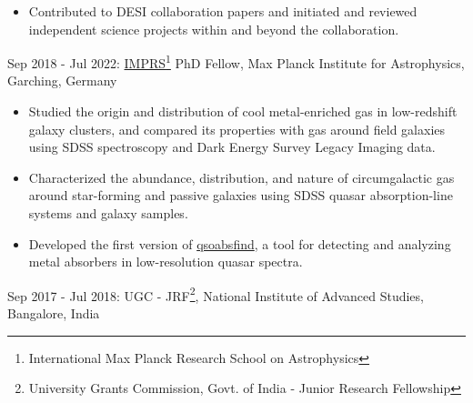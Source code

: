 \documentclass[11pt,letterpaper]{article}
\begin{document}
\begin{list}{}{\cvlist}
\begin{itemize}
  \item Contributed to DESI collaboration papers and initiated and reviewed independent science projects within and beyond the collaboration.

  \vspace{-1mm}
\end{itemize}

\item Sep 2018 - Jul 2022: \href{https://www.imprs-astro.mpg.de/content/student-class-2018-2021.html}{IMPRS\footnote{International Max Planck Research School on Astrophysics} PhD Fellow}, Max Planck Institute for Astrophysics, Garching, Germany
\begin{itemize}

  \item Studied the origin and distribution of cool metal-enriched gas in low-redshift galaxy clusters, and compared its properties with gas around field galaxies using SDSS spectroscopy and Dark Energy Survey Legacy Imaging data.

  \item Characterized the abundance, distribution, and nature of circumgalactic gas around star-forming and passive galaxies using SDSS quasar absorption-line systems and galaxy samples.

  \item Developed the first version of \href{https://github.com/abhi0395/qsoabsfind}{qsoabsfind}, a tool for detecting and analyzing metal absorbers in low-resolution quasar spectra.

\end{itemize}

\item Sep 2017 - Jul 2018: UGC - JRF\footnote{University Grants Commission, Govt. of India - Junior Research Fellowship}, National Institute of Advanced Studies, Bangalore, India
\end{list}
\vspace{-1.5mm}
\end{document}
